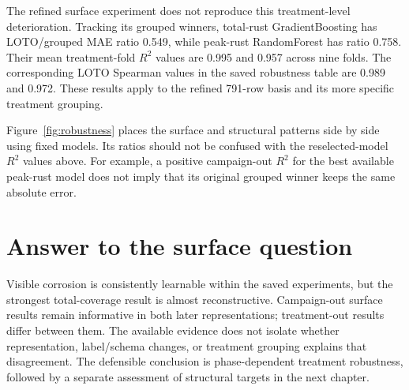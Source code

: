 The refined surface experiment does not reproduce this treatment-level deterioration. Tracking its grouped winners, total-rust GradientBoosting has LOTO/grouped MAE ratio 0.549, while peak-rust RandomForest has ratio 0.758. Their mean treatment-fold $R^2$ values are 0.995 and 0.957 across nine folds. The corresponding LOTO Spearman values in the saved robustness table are 0.989 and 0.972. These results apply to the refined 791-row basis and its more specific treatment grouping.

Figure~\ref{fig:robustness} places the surface and structural patterns side by side using fixed models. Its ratios should not be confused with the reselected-model $R^2$ values above. For example, a positive campaign-out $R^2$ for the best available peak-rust model does not imply that its original grouped winner keeps the same absolute error.


\FloatBarrier
\section{Answer to the surface question}
Visible corrosion is consistently learnable within the saved experiments, but the strongest total-coverage result is almost reconstructive. Campaign-out surface results remain informative in both later representations; treatment-out results differ between them. The available evidence does not isolate whether representation, label/schema changes, or treatment grouping explains that disagreement. The defensible conclusion is phase-dependent treatment robustness, followed by a separate assessment of structural targets in the next chapter.

